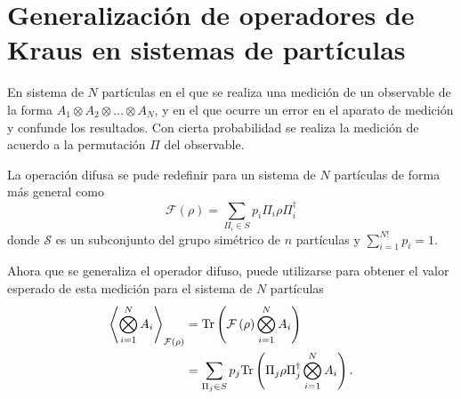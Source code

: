 \documentclass[12pt,oneside]{book}\raggedbottom{}
\begin{document}
\newcommand{\myName}{Condiciones para que los instrumentos cu\'anticos sean equivalentes}
\newcommand{\myDate}{Primer semestre 2021}
\newcommand{\myCourse}{}
\newcommand{\degre}{\ensuremath{^\circ}}
\newcommand{\R}{\mathbb{R}}
\newcommand{\vi}{\mathbf{\hat{\i}}}
\newcommand{\vj}{\mathbf{\hat{\j}}}
\newcommand{\vk}{\mathbf{\hat{\k}}}
\newcommand{\tensor}{\otimes}
\newcommand{\prodtensor}{\bigotimes_{i=1}^{N}}
\newcommand{\fuzzy}[1]{\mathcal{F}\left(#1\right)}
\newcommand{\fuzzydagger}[1]{\mathcal{F}^{\dagger}\left(#1\right)}
\newcommand{\permut}[2]{\Pi_{#1}#2\Pi_{#1}^{\dagger}}
\newcommand{\permutdagger}[2]{\Pi_{#1}^{\dagger}#2\Pi_{#1}}

\section*{Generalización de operadores de Kraus en sistemas de \texorpdfstring{}{N} partículas}





En sistema de $N$ partículas en el que se realiza una medición de un observable de la forma $A_1\tensor A_2\tensor \hdots \tensor A_N$, y en el que ocurre un error en el aparato de medición y confunde los resultados. Con cierta probabilidad se realiza la medición de acuerdo a la permutación $\Pi$ del observable. 

La operación difusa se pude redefinir para un sistema de $N$ partículas de forma más general como\begin{equation}\label{eq:fm-nparticles}
   \fuzzy{\rho}=\sum_{\Pi_i\in S}p_{i}\permut{i}{\rho}
\end{equation}donde $\mathcal{S}$ es un subconjunto del grupo simétrico de $n$ partículas y $\sum_{i=1}^{N!} p_i=1$. 

Ahora que se generaliza el operador difuso, puede utilizarse para obtener el valor esperado de esta medición para el sistema de $N$ partículas \begin{equation}\label{eq:ExpectedValue-generalForm}\begin{split}
    \left \langle \prodtensor A_i\right \rangle_{\mathcal{F}(\rho)} &=\tr\left(\fuzzy{\rho}\prodtensor A_i\right)\\
    &=\sum_{\Pi_j \in S}p_{j}\tr \left(\permut{j}{\rho} \prodtensor A_i\right).
\end{split}
\end{equation}  
\end{document}
